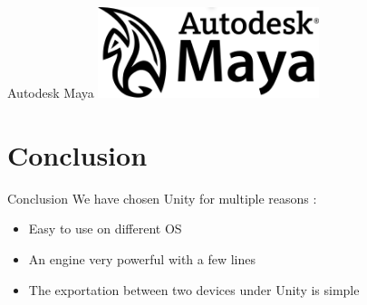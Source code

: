 \documentclass[a4paper,10pt]{beamer}
\begin{document}
			\begin{frame}{Autodesk Maya}
				\includegraphics[height=75pt]{images/AutoDesk_Maya.png}
			\end{frame}
			
	\section{Conclusion}
		
		\begin{frame}{Conclusion}
			We have chosen Unity for multiple reasons :
			\begin{itemize}
				\item Easy to use on different OS
				\item An engine very powerful with a few lines
				\item The exportation between two devices under Unity is simple
			\end{itemize}			
		\end{frame}
	
\end{document}
